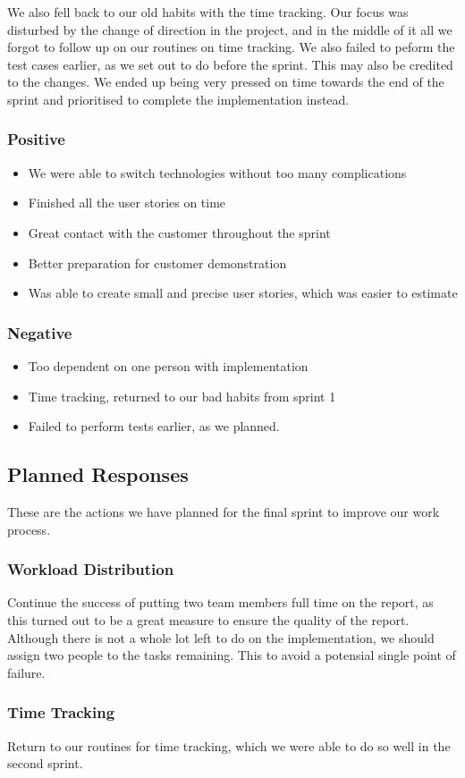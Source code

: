 We also fell back to our old habits with the time tracking. Our focus was disturbed by the change of direction in the project, and in the middle of it all we forgot to follow up on our routines on time tracking. We also failed to peform the test cases earlier, as we set out to do before the sprint. This may also be credited to the changes. We ended up being very pressed on time towards the end of the sprint and prioritised to complete the implementation instead.

\subsubsection{Positive}

\begin{itemize}
\item We were able to switch technologies without too many complications
\item Finished all the user stories on time
\item Great contact with the customer throughout the sprint
\item Better preparation for customer demonstration
\item Was able to create small and precise user stories, which was easier to estimate
\end{itemize}

\subsubsection{Negative}

\begin{itemize}
\item Too dependent on one person with implementation
\item Time tracking, returned to our bad habits from sprint 1
\item Failed to perform tests earlier, as we planned.
\end{itemize}

\subsection{Planned Responses}
These are the actions we have planned for the final sprint to improve our work process.

\subsubsection{Workload Distribution}
Continue the success of putting two team members full time on the report, as this turned out to be a great measure to ensure the quality of the report. Although there is not a whole lot left to do on the implementation, we should assign two people to the tasks remaining. This to avoid a potensial single point of failure.

\subsubsection{Time Tracking}
Return to our routines for time tracking, which we were able to do so well in the second sprint.


